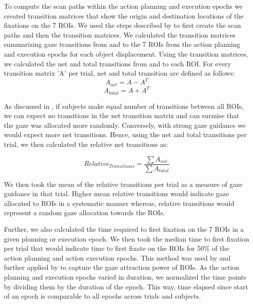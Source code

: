 To compute the scan paths within the action planning and execution epochs we created transition matrices that show the origin and destination locations of the fixations on the 7 ROIs. We used the steps described by \citet{Hooge2013-bk} to first create the scan paths and then the transition matrices. We calculated the transition matrices summarizing gaze transitions from and to the 7 ROIs from the action planning and execution epochs for each object displacement. Using the transition matrices, we calculated the net and total transitions from and to each ROI. For every transition matrix 'A' per trial, net and total transition are defined as follows:
\begin{equation}\label{eq:net_transitions}
     A_{net} = A - A^T
\end{equation}  
\begin{equation}\label{eq:total_transitions}
     A_{total} = A + A^T
\end{equation}  

As discussed in \citet{Hooge2013-bk}, if subjects make equal number of transitions between all ROIs, we can expect no transitions in the net transition matrix and can surmise that the gaze was allocated more randomly. Conversely, with strong gaze guidance we would expect more net transitions. Hence, using the net and total transitions per trial, we then calculated the relative net transitions as:

\begin{equation}\label{eq:f_value}
     Relative_{Transitions} = \frac{\sum A_{net}}{\sum A_{total}}
\end{equation}  

We then took the mean of the relative transitions per trial as a measure of gaze guidance in that trial. Higher mean relative transitions would indicate gaze allocated to ROIs in a systematic manner whereas, relative transitions would represent a random gaze allocation towards the ROIs.

Further, we also calculated the time required to first fixation on the 7 ROIs in a given planning or execution epoch. We then took the median time to first fixation per trial that would indicate time to first fixate on the ROIs for 50\% of the action planning and action execution epochs. This method was used by \citet{Montfoort2007-oa} and further applied by \citet{Hooge2013-bk} to capture the gaze attraction power of ROIs. As the action planning and execution epochs varied in duration, we normalized the time points by dividing them by the duration of the epoch. This way, time elapsed since start of an epoch is comparable to all epochs across trials and subjects.


